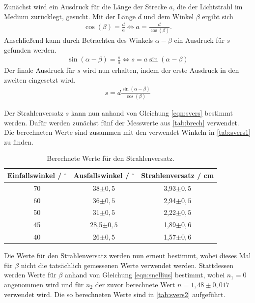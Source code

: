 \noindent
Zunächst wird ein Ausdruck für die Länge der Strecke $a$, die der Lichtstrahl im Medium zurücklegt, gesucht. Mit der Länge $d$ und dem Winkel $\beta$ ergibt sich 
\begin{align*}
  \cos(\beta) = \frac{d}{a} \Leftrightarrow a = \frac{d}{\cos(\beta)}.
\end{align*}
Anschließend kann durch Betrachten des Winkels $\alpha - \beta$ ein Ausdruck für $s$ gefunden werden.
\begin{align*}
  \sin(\alpha - \beta) = \frac{s}{a} \Leftrightarrow s = a \sin(\alpha - \beta)
\end{align*}
Der finale Ausdruck für $s$ wird nun erhalten, indem der erste Ausdruck in den zweiten eingesetzt wird.
\begin{align}
  s = d \frac{\sin(\alpha - \beta)}{\cos(\beta)}
  \label{eqn:svers}
\end{align}

\noindent
Der Strahlenversatz $s$ kann nun anhand von Gleichung \eqref{eqn:svers} bestimmt werden. Dafür werden zunächst fünf der Messwerte aus \autoref{tab:brech} verwendet.
Die berechneten Werte sind zusammen mit den verwendet Winkeln in \autoref{tab:svers1} zu finden.

\begin{table}[H]
  \centering
  \caption{Berechnete Werte für den Strahlenversatz.}
  \label{tab:svers1}
  \begin{tabular}{c c c}
    \toprule
    Einfallswinkel / $^{\circ}$ & Ausfallswinkel / $^{\circ}$ & Strahlenversatz / \si{\centi\meter} \\
    \midrule
    70 & 38$\pm 0,5$ & 3,93$\pm 0,5$\\
    60 & 36$\pm 0,5$ & 2,94$\pm 0,5$\\
    50 & 31$\pm 0,5$ & 2,22$\pm 0,5$\\
    45 & 28,5$\pm 0,5$ & 1,89$\pm 0,6$\\
    40 & 26$\pm 0,5$ & 1,57$\pm 0,6$\\
    \bottomrule
  \end{tabular}
\end{table}

\noindent
Die Werte für den Strahlenversatz werden nun erneut bestimmt, wobei dieses Mal für $\beta$ nicht die tatsächlich gemessenen Werte verwendet werden. Stattdessen werden
Werte für $\beta$ anhand von Gleichung \eqref{eqn:snellius} bestimmt, wobei $n_1 = 0$ angenommen wird und für $n_2$ der zuvor berechnete Wert $n = 1,48 \pm 0,017$
verwendet wird. Die so berechneten Werte sind in \autoref{tab:svers2} aufgeführt.

